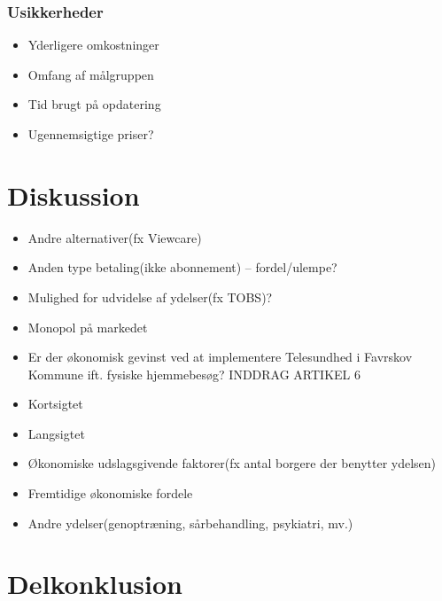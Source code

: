 \subsubsection{Usikkerheder}
\begin{itemize}
	\item Yderligere omkostninger
	\item Omfang af målgruppen
	\item Tid brugt på opdatering
	\item Ugennemsigtige priser?
\end{itemize}





\section{Diskussion}
\begin{itemize}
	\item Andre alternativer(fx Viewcare)
	\item Anden type betaling(ikke abonnement) – fordel/ulempe?
	\item Mulighed for udvidelse af ydelser(fx TOBS)? 
	\item Monopol på markedet
	\item Er der økonomisk gevinst ved at implementere Telesundhed i Favrskov Kommune ift. fysiske hjemmebesøg? INDDRAG ARTIKEL 6
	\item Kortsigtet
	\item Langsigtet
	\item Økonomiske udslagsgivende faktorer(fx antal borgere der benytter ydelsen)
	\item Fremtidige økonomiske fordele
	\item Andre ydelser(genoptræning, sårbehandling, psykiatri, mv.)
\end{itemize}
\section{Delkonklusion}